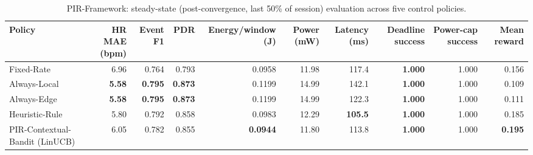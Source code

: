 \begin{table}[t]
\centering
\caption{PIR-Framework: steady-state (post-convergence, last 50\% of session) evaluation across five control policies.}
\label{tab:pir_overall}
\begin{tabular}{lrrrrrrrrr}
\toprule
Policy & HR MAE (bpm) & Event F1 & PDR & Energy/window (J) & Power (mW) & Latency (ms) & Deadline success & Power-cap success & Mean reward \\
\midrule
Fixed-Rate & 6.96 & 0.764 & 0.793 & 0.0958 & 11.98 & 117.4 & \textbf{1.000} & 1.000 & 0.156 \\
Always-Local & \textbf{5.58} & \textbf{0.795} & \textbf{0.873} & 0.1199 & 14.99 & 142.1 & \textbf{1.000} & 1.000 & 0.109 \\
Always-Edge & \textbf{5.58} & \textbf{0.795} & \textbf{0.873} & 0.1199 & 14.99 & 122.3 & \textbf{1.000} & 1.000 & 0.111 \\
Heuristic-Rule & 5.80 & 0.792 & 0.858 & 0.0983 & 12.29 & \textbf{105.5} & \textbf{1.000} & 1.000 & 0.185 \\
PIR-Contextual-Bandit (LinUCB) & 6.05 & 0.782 & 0.855 & \textbf{0.0944} & 11.80 & 113.8 & \textbf{1.000} & 1.000 & \textbf{0.195} \\
\bottomrule
\end{tabular}
\end{table}